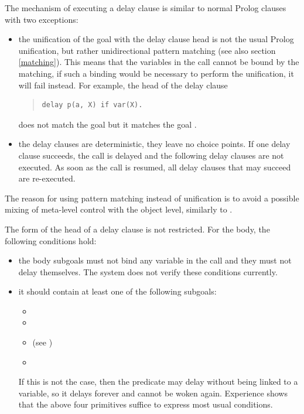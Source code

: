 The mechanism of executing a delay clause is similar to normal Prolog
clauses with two exceptions:
\begin{itemize}
\item the unification of the goal with the delay clause head is not the usual
Prolog unification, but rather unidirectional pattern matching
(see also section \ref{matching}).
This means that the variables in the call cannot be bound
by the matching, if such a binding would be necessary to
perform the unification, it will fail instead.
For example, the head of the delay clause
\begin{quote}
\begin{verbatim}
delay p(a, X) if var(X).
\end{verbatim}
\end{quote}
does not match the goal  but it matches the goal
.

\item the delay clauses are deterministic, they leave no choice points.
If one delay clause succeeds, the call is delayed and the following delay
clauses are not executed.
As soon as the call is resumed, all delay clauses that may succeed
are re-executed.
\end{itemize}
The reason for using pattern matching instead of unification
is to avoid a possible mixing of meta-level control with the
object level, similarly to \cite{dincbas84}.


The form of the head of a delay clause is not restricted.
For the body, the following conditions hold:

\begin{itemize}
\item the body subgoals must not bind any variable in the call and they
must not delay themselves.
The system does not verify these conditions currently.

\item it should contain at least one of the following subgoals:
\begin{itemize}
\item {}
\item {}
\item {} (see
  )
\item {}
\end{itemize}
If this is not the case, then the predicate may delay without being linked
to a variable, so it delays forever and cannot be woken again.
Experience shows that the above four primitives suffice to express most
usual conditions.
\end{itemize}


